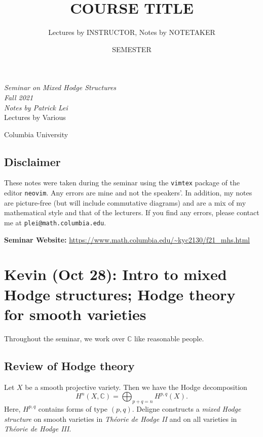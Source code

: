 \documentclass[leqno, openany]{memoir}
\title{COURSE TITLE}
\author{Lectures by INSTRUCTOR, Notes by NOTETAKER}
\date{SEMESTER}
\theoremstyle{definition}
\theoremstyle{remark}
\theoremstyle{plain}
\theoremstyle{definition}
\theoremstyle{remark}
\newcommand{\C}{\mathbb{C}}
\newcommand*{\titleSW}
    {\begingroup%
    \raggedleft
    \vspace*{\baselineskip}
    {\Huge\itshape Seminar on Mixed Hodge Structures \\ Fall 2021}\\[\baselineskip]
    {\large\itshape Notes by Patrick Lei}\\[0.2\textheight]
    {\Large Lectures by Various}\par
    \vfill
    {\Large \sffamily Columbia University}
    \vspace*{\baselineskip}
\endgroup}
\begin{document}
    
\begin{titlingpage}
\titleSW
\end{titlingpage}

\thispagestyle{empty}
\section*{Disclaimer}%
\label{sec:disclaimer}

These notes were taken during the seminar using the \texttt{vimtex} package of the editor \texttt{neovim}. 
Any errors are mine and not the speakers'. 
In addition, my notes are picture-free (but will include commutative diagrams) and are a mix of my mathematical style and that of the lecturers.
If you find any errors, please contact me at \texttt{plei@math.columbia.edu}.

\vspace*{1cm}

\noindent\textbf{Seminar Website:}  \url{https://www.math.columbia.edu/~kyc2130/f21_mhs.html}
\newpage

\tableofcontents

\chapter{Kevin (Oct 28): Intro to mixed Hodge structures; Hodge theory for smooth varieties}%
\label{cha:kevin_oct_28_intro_to_mixed_hodge_structures_hodge_theory_for_smooth_varieties}

Throughout the seminar, we work over $\C$ like reasonable people.

\section{Review of Hodge theory}%
\label{sec:review_of_hodge_theory}

Let $X$ be a smooth projective variety. Then we have the Hodge decomposition
\[ H^n(X, \C) = \bigoplus_{p+q=n} H^{p,q}(X). \]
Here, $H^{p,q}$ contains forms of type $(p,q)$. Deligne constructs a \textit{mixed Hodge structure} on smooth varieties in \textit{Th\'eorie de Hodge II} and on all varieties in \textit{Th\'eorie de Hodge III}.
\end{document}
